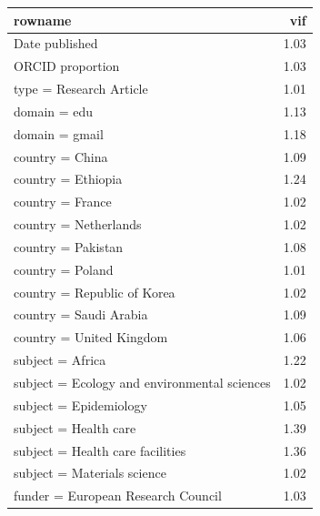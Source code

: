 \begin{table}[ht]
\centering
\begin{tabular}{lr}
 rowname & vif \\ 
  \hline
Date published & 1.03 \\ 
  ORCID proportion & 1.03 \\ 
  type = Research Article & 1.01 \\ 
  domain = edu & 1.13 \\ 
  domain = gmail & 1.18 \\ 
  country = China & 1.09 \\ 
  country = Ethiopia & 1.24 \\ 
  country = France & 1.02 \\ 
  country = Netherlands & 1.02 \\ 
  country = Pakistan & 1.08 \\ 
  country = Poland & 1.01 \\ 
  country = Republic of Korea & 1.02 \\ 
  country = Saudi Arabia & 1.09 \\ 
  country = United Kingdom & 1.06 \\ 
  subject = Africa & 1.22 \\ 
  subject = Ecology and environmental sciences & 1.02 \\ 
  subject = Epidemiology & 1.05 \\ 
  subject = Health care & 1.39 \\ 
  subject = Health care facilities & 1.36 \\ 
  subject = Materials science & 1.02 \\ 
  funder = European Research Council & 1.03 \\ 
  \end{tabular}
\end{table}
